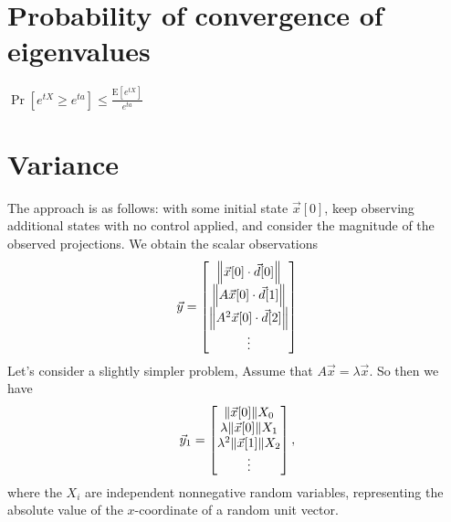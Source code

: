 \documentclass[letterpaper]{article}
\theoremstyle{remark}
\newcommand{\mat}[1]{\ensuremath{\begin{bmatrix}#1\end{bmatrix}}}
\begin{document}
\section*{Probability of convergence of eigenvalues}

$\Pr[e^{tX} \geq e^{ta}] \leq \frac{\mathrm{E}[e^{tX}]}{e^{ta}}$

\section*{Variance}
The approach is as follows: with some initial state $\vec{x}[0]$, keep observing additional states with no control applied, and consider the magnitude of the observed projections. We obtain the scalar observations
\[
    \vec{y} = \mat{\norm{\vec{x}[0] \cdot \vec{d}[0]} \\ \norm{A\vec{x}[0] \cdot \vec{d}[1]} \\ \norm{A^2 \vec{x}[0] \cdot \vec{d}[2]} \\ \vdots}
\]
Let's consider a slightly simpler problem, Assume that $A\vec{x} = \lambda \vec{x}$. So then we have
\[
    \vec{y}_1 = \mat{\norm{\vec{x}[0]} X_0 \\ \lambda \norm{\vec{x}[0]} X_1 \\ \lambda^2 \norm{\vec{x}[1]} X_2 \\ \vdots},
\]
where the $X_i$ are independent nonnegative random variables, representing the absolute value of the $x$-coordinate of a random unit vector.
\end{document}
